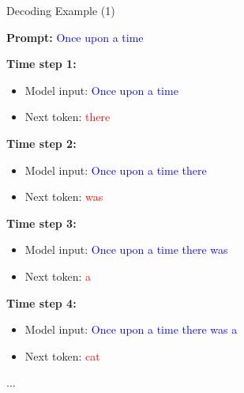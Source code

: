 \begin{frame}{Decoding Example (1)}
\footnotesize%


{\fontsize{8pt}{10pt}\selectfont
\noindent \textbf{Prompt:} \textcolor{blue}{Once upon a time}

\vspace{0.15cm}%

\noindent \textbf{Time step 1:}
\begin{itemize}
    \item Model input: \textcolor{blue}{Once upon a time}
    \item Next token: \textcolor{red}{there}
\end{itemize}

\vspace{0.15cm}%

\noindent \textbf{Time step 2:}
\begin{itemize}
    \item Model input: \textcolor{blue}{Once upon a time there}
    \item Next token: \textcolor{red}{was}
\end{itemize}

\vspace{0.15cm}%

\noindent \textbf{Time step 3:}
\begin{itemize}
    \item Model input: \textcolor{blue}{Once upon a time there was}
    \item Next token: \textcolor{red}{a}
\end{itemize}

\vspace{0.15cm}%

\noindent \textbf{Time step 4:}
\begin{itemize}
    \item Model input: \textcolor{blue}{Once upon a time there was a}
    \item Next token: \textcolor{red}{cat}
\end{itemize}
...
}
\end{frame}


